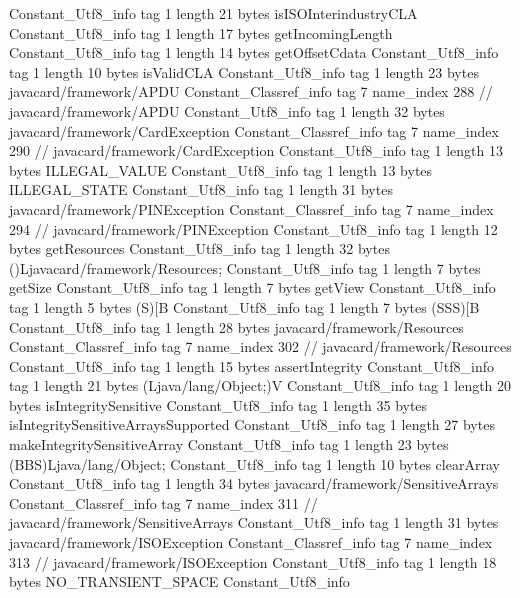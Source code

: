{{{		}
		Constant_Utf8_info {
			tag	1
			length	21
			bytes	isISOInterindustryCLA
		}
		Constant_Utf8_info {
			tag	1
			length	17
			bytes	getIncomingLength
		}
		Constant_Utf8_info {
			tag	1
			length	14
			bytes	getOffsetCdata
		}
		Constant_Utf8_info {
			tag	1
			length	10
			bytes	isValidCLA
		}
		Constant_Utf8_info {
			tag	1
			length	23
			bytes	javacard/framework/APDU
		}
		Constant_Classref_info {
			tag	7
			name_index	288		// javacard/framework/APDU
		}
		Constant_Utf8_info {
			tag	1
			length	32
			bytes	javacard/framework/CardException
		}
		Constant_Classref_info {
			tag	7
			name_index	290		// javacard/framework/CardException
		}
		Constant_Utf8_info {
			tag	1
			length	13
			bytes	ILLEGAL_VALUE
		}
		Constant_Utf8_info {
			tag	1
			length	13
			bytes	ILLEGAL_STATE
		}
		Constant_Utf8_info {
			tag	1
			length	31
			bytes	javacard/framework/PINException
		}
		Constant_Classref_info {
			tag	7
			name_index	294		// javacard/framework/PINException
		}
		Constant_Utf8_info {
			tag	1
			length	12
			bytes	getResources
		}
		Constant_Utf8_info {
			tag	1
			length	32
			bytes	()Ljavacard/framework/Resources;
		}
		Constant_Utf8_info {
			tag	1
			length	7
			bytes	getSize
		}
		Constant_Utf8_info {
			tag	1
			length	7
			bytes	getView
		}
		Constant_Utf8_info {
			tag	1
			length	5
			bytes	(S)[B
		}
		Constant_Utf8_info {
			tag	1
			length	7
			bytes	(SSS)[B
		}
		Constant_Utf8_info {
			tag	1
			length	28
			bytes	javacard/framework/Resources
		}
		Constant_Classref_info {
			tag	7
			name_index	302		// javacard/framework/Resources
		}
		Constant_Utf8_info {
			tag	1
			length	15
			bytes	assertIntegrity
		}
		Constant_Utf8_info {
			tag	1
			length	21
			bytes	(Ljava/lang/Object;)V
		}
		Constant_Utf8_info {
			tag	1
			length	20
			bytes	isIntegritySensitive
		}
		Constant_Utf8_info {
			tag	1
			length	35
			bytes	isIntegritySensitiveArraysSupported
		}
		Constant_Utf8_info {
			tag	1
			length	27
			bytes	makeIntegritySensitiveArray
		}
		Constant_Utf8_info {
			tag	1
			length	23
			bytes	(BBS)Ljava/lang/Object;
		}
		Constant_Utf8_info {
			tag	1
			length	10
			bytes	clearArray
		}
		Constant_Utf8_info {
			tag	1
			length	34
			bytes	javacard/framework/SensitiveArrays
		}
		Constant_Classref_info {
			tag	7
			name_index	311		// javacard/framework/SensitiveArrays
		}
		Constant_Utf8_info {
			tag	1
			length	31
			bytes	javacard/framework/ISOException
		}
		Constant_Classref_info {
			tag	7
			name_index	313		// javacard/framework/ISOException
		}
		Constant_Utf8_info {
			tag	1
			length	18
			bytes	NO_TRANSIENT_SPACE
		}
		Constant_Utf8_info {
}}}
